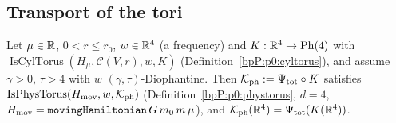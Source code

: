 \subsection{Transport of the tori}\label{bpP:p12:sec-tr}

\begin{proposition}\label{bpP:p12:transport}
Let $\mu\in\mathbb{R}$, $0<r\le r_0$, $w\in\mathbb{R}^4$ (a frequency) and $K:\mathbb{R}^4\to\mathrm{Ph}(4)$ with $\operatorname{IsCylTorus}(H_\mu,\mathcal C(V,r),w,K)$ (Definition~\ref{bpP:p0:cyltorus}), and assume $\gamma>0$, $\tau>4$ with $w$ $(\gamma,\tau)$-Diophantine. Then $\mathcal K_{\rm ph}:=\Psi_{\rm tot}\circ K$ satisfies $\operatorname{IsPhysTorus}(H_{\rm mov},w,\mathcal K_{\rm ph})$ (Definition~\ref{bpP:p0:phystorus}, $d=4$, $H_{\rm mov}=\texttt{movingHamiltonian}\,G\,m_0\,m\,\mu$), and $\mathcal K_{\rm ph}(\mathbb{R}^4)=\Psi_{\rm tot}(K(\mathbb{R}^4))$.
\end{proposition}
